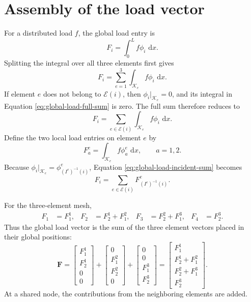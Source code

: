 \documentclass[11pt,letterpaper]{scrartcl}
\newcommand{\dd}{\,\mathrm{d}}
\newcommand{\bF}{\bm{F}}
\begin{document}
\section{Assembly of the load vector}

For a distributed load $f$, the global load entry is
\begin{equation}
F_i=\int_0^L f\phi_i\,\dd x.
\label{eq:global-load-entry}
\end{equation}
Splitting the integral over all three elements first gives
\begin{equation}
F_i
=\sum_{e=1}^{3}
\int_{\mathcal K_e}f\phi_i\,\dd x.
\label{eq:global-load-full-sum}
\end{equation}
If element $e$ does not belong to $\mathcal E(i)$, then
$\phi_i|_{\mathcal K_e}=0$, and its integral in Equation
\eqref{eq:global-load-full-sum} is zero. The full sum therefore reduces to
\begin{equation}
F_i
=\sum_{e\in\mathcal E(i)}
\int_{\mathcal K_e}f\phi_i\,\dd x.
\label{eq:global-load-incident-sum}
\end{equation}
Define the two local load entries on element $e$ by
\begin{equation}
F_a^e=\int_{\mathcal K_e}f\phi_a^e\,\dd x,
\qquad a=1,2.
\label{eq:local-load-entry}
\end{equation}
Because $\phi_i|_{\mathcal K_e}=\phi_{(I^e)^{-1}(i)}^e$, Equation
\eqref{eq:global-load-incident-sum} becomes
\begin{equation}
\boxed{
F_i=\sum_{e\in\mathcal E(i)}F_{(I^e)^{-1}(i)}^e.
}
\label{eq:load-entry-assembly}
\end{equation}

For the three-element mesh,
\begin{align*}
F_1&=F_1^1,&
F_2&=F_2^1+F_1^2,&
F_3&=F_2^2+F_1^3,&
F_4&=F_2^3.
\end{align*}
Thus the global load vector is the sum of the three element vectors placed in
their global positions:
\begin{equation}
\boxed{
\bF
=
\begin{bmatrix}F_1^1\\F_2^1\\0\\0\end{bmatrix}
+
\begin{bmatrix}0\\F_1^2\\F_2^2\\0\end{bmatrix}
+
\begin{bmatrix}0\\0\\F_1^3\\F_2^3\end{bmatrix}
=
\begin{bmatrix}
F_1^1\\
F_2^1+F_1^2\\
F_2^2+F_1^3\\
F_2^3
\end{bmatrix}.
}
\label{eq:global-load-vector}
\end{equation}
At a shared node, the contributions from the neighboring elements are added.
\end{document}
